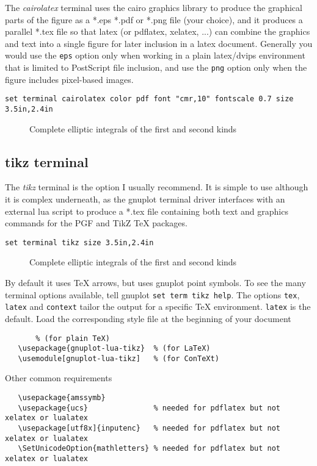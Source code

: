 \documentclass[letterpaper,11pt]{article}
\newcommand{\gpinsetfigure}[2]{
  \begin{figure}[H]
  \centering
  
  \caption{#2}
  \end{figure}
}
\begin{document}
The {\em cairolatex} terminal uses the cairo graphics library to produce
the graphical parts of the figure as a *.eps *.pdf or *.png file (your choice),
and it produces a parallel *.tex file so that latex (or pdflatex, xelatex, ...)
can combine the graphics and text into a single figure for later inclusion in a
latex document.  Generally you would use the {\tt eps} option only when working
in a plain latex/dvips environment that is limited to PostScript file inclusion,
and use the {\tt png} option only when the figure includes pixel-based images.

\begin{verbatim}
set terminal cairolatex color pdf font "cmr,10" fontscale 0.7 size 3.5in,2.4in
\end{verbatim}
\gpinsetfigure{latex_cairo}
              {Complete elliptic integrals of the first and second kinds}


\subsection*{tikz terminal}

The {\em tikz} terminal is the option I usually recommend.
It is simple to use although it is complex underneath, as the gnuplot
terminal driver interfaces with an external lua script to produce a *.tex file
containing both text and graphics commands for the PGF and TikZ {\TeX} packages.

\begin{verbatim}
set terminal tikz size 3.5in,2.4in
\end{verbatim}
\gpinsetfigure{latex_tikz}
              {Complete elliptic integrals of the first and second kinds}

By default it uses {\TeX} arrows, but uses gnuplot point symbols.
To see the many terminal options available, tell gnuplot {\tt set term tikz help}.
The options {\tt tex}, {\tt latex} and {\tt context} tailor the output for
a specific {\TeX} environment.  {\tt latex} is the default.
Load the corresponding style file at the beginning of your document
\begin{verbatim}
       % (for plain TeX)
   \usepackage{gnuplot-lua-tikz}  % (for LaTeX)
   \usemodule[gnuplot-lua-tikz]   % (for ConTeXt)
\end{verbatim}
Other common requirements
\begin{verbatim}
   \usepackage{amssymb}
   \usepackage{ucs}               % needed for pdflatex but not xelatex or lualatex
   \usepackage[utf8x]{inputenc}   % needed for pdflatex but not xelatex or lualatex
   \SetUnicodeOption{mathletters} % needed for pdflatex but not xelatex or lualatex
\end{verbatim}
\end{document}
